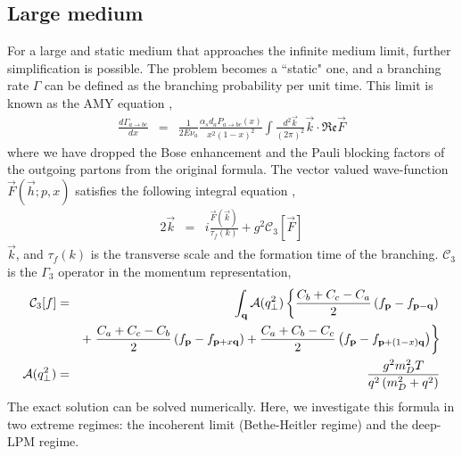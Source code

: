 \subsection{Large medium}
For a large and static medium that approaches the infinite medium limit, 
further simplification is possible. 
The problem becomes a ``static" one, and a branching rate $\Gamma$ can be defined as the branching probability per unit time.
This limit is known as the AMY equation \cite{Arnold:2002ja,Arnold:2002zm,Arnold:2003zc},
\begin{eqnarray}\label{eq:AMY-1}
\nonumber
\frac{d\Gamma_{a\rightarrow bc}}{dx} &=& \frac{1}{2E\nu_a} \frac{\alpha_s d_a P_{a\rightarrow bc}(x)}{x^2(1-x)^2}\int\frac{d^2\vec{k}}{(2\pi)^2}\vec{k}\cdot \mathfrak{Re} \vec{F}
\end{eqnarray}
where we have dropped the Bose enhancement and the Pauli blocking factors of the outgoing partons from the original formula.
The vector valued wave-function $\vec{F}(\vec{h}; p, x)$ satisfies the following integral equation \cite{Arnold:2002ja},
\begin{eqnarray}\label{eq:AMY-2}
\nonumber
2\vec{k} &=& i\frac{\vec{F}(\vec{k})}{\tau_f(k)}  + g^2 \mathcal{C}_3[\vec{F}]
\end{eqnarray} 
$\vec{k}$, and $\tau_f(k)$ is the transverse scale and the formation time of the branching. $\mathcal{C}_3$ is the $\Gamma_3$ operator in the momentum representation,
\begin{eqnarray}
\mathcal{C}_3[f] &=& \int_{\bf q} \mathcal{A}(q_\perp^2)
\left\{  \frac{C_b+C_c-C_a}{2}\left(f_{\bf p}-f_{{\bf p}-{\bf q}}\right) \right.\\\nonumber
&& + \left. \frac{C_a+C_c-C_b}{2}\left(f_{\bf p}-f_{{\bf p}+x{\bf q}}\right) + \frac{C_a+C_b-C_c}{2}\left(f_{\bf p}-f_{{\bf p}+(1-x){\bf q}}\right)\right\}\\
\mathcal{A}(q_\perp^2) &=& \frac{g^2 m_D^2 T}{q^2\left(m_D^2+q^2\right)}
\end{eqnarray}
The exact solution can be solved numerically.
Here, we investigate this formula in two extreme regimes: the incoherent limit (Bethe-Heitler regime) and the deep-LPM regime.

